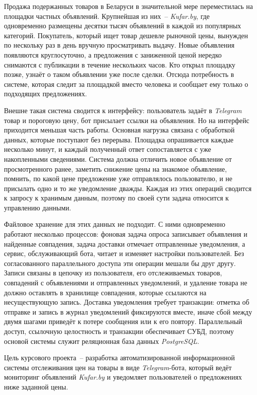
Продажа подержанных товаров в Беларуси в значительной мере переместилась на площадки частных объявлений. Крупнейшая из них~-- \textit{Kufar.by}, где одновременно размещены десятки тысяч объявлений в каждой из популярных категорий. Покупатель, который ищет товар дешевле рыночной цены, вынужден по нескольку раз в день вручную просматривать выдачу. Новые объявления появляются круглосуточно, а предложения с заниженной ценой нередко снимаются с публикации в течение нескольких часов. Кто открыл площадку позже, узнаёт о таком объявлении уже после сделки. Отсюда потребность в системе, которая следит за площадкой вместо человека и сообщает ему только о подходящих предложениях.

Внешне такая система сводится к интерфейсу: пользователь задаёт в \textit{Telegram} товар и пороговую цену, бот присылает ссылки на объявления. Но на интерфейс приходится меньшая часть работы. Основная нагрузка связана с обработкой данных, которые поступают без перерыва. Площадка опрашивается каждые несколько минут, и каждый полученный ответ сопоставляется с уже накопленными сведениями. Система должна отличить новое объявление от просмотренного ранее, заметить снижение цены на знакомое объявление, помнить, по какой цене предложение уже отправлялось пользователю, и не присылать одно и то же уведомление дважды. Каждая из этих операций сводится к запросу к хранимым данным, поэтому по своей сути задача относится к управлению данными.

Файловое хранение для этих данных не подходит. С ними одновременно работают несколько процессов: фоновая задача опроса записывает объявления и найденные совпадения, задача доставки отмечает отправленные уведомления, а сервис, обслуживающий бота, читает и изменяет настройки пользователей. Без согласованного параллельного доступа эти операции мешали бы друг другу. Записи связаны в цепочку из пользователя, его отслеживаемых товаров, совпадений с объявлениями и отправленных уведомлений, и удаление товара не должно оставлять в хранилище совпадения, которые ссылаются на несуществующую запись. Доставка уведомления требует транзакции: отметка об отправке и запись в журнал уведомлений фиксируются вместе, иначе сбой между двумя шагами приведёт к потере сообщения или к его повтору. Параллельный доступ, ссылочную целостность и транзакции обеспечивает СУБД, поэтому основой системы служит реляционная база данных \textit{PostgreSQL}.

Цель курсового проекта~-- разработка автоматизированной информационной системы отслеживания цен на товары в виде \textit{Telegram}-бота, который ведёт мониторинг объявлений \textit{Kufar.by} и уведомляет пользователей о предложениях ниже заданной цены.

